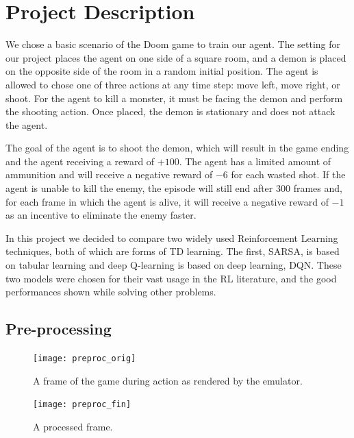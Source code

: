 \documentclass[letterpaper]{article} %
\begin{document}
\section{Project Description}
We chose a basic scenario of the Doom game to train our agent. The setting for our project places the agent on one side of a square room, and a demon is placed on the opposite side of the room in a random initial position. The agent is allowed to chose one of three actions at any time step: move left, move right, or shoot. For the agent to kill a monster, it must be facing the demon and perform the shooting action. Once placed, the demon is stationary  and does not attack the agent. 

The goal of the agent is to shoot the demon, which will result in the game ending and the agent receiving a reward of $+100$. The agent has a limited amount of ammunition and will receive a negative reward of $-6$ for each wasted shot. If the agent is unable to kill the enemy, the episode will still end after $300$ frames and, for each frame in which the agent is alive, it will receive a negative reward of $-1$ as an incentive to eliminate the enemy faster.

In this project we decided to compare two widely used Reinforcement Learning techniques, both of which are forms of TD learning. The first, SARSA, is based on tabular learning and deep Q-learning is based on deep learning, DQN. These two models were chosen for their vast usage in the RL literature, and the good performances shown while solving other problems.


\subsection{Pre-processing}

\begin{figure}
  \texttt{[image: preproc\_orig]}
  \caption{A frame of the game during action as rendered by the emulator.}
\label{preproc_orig}
\end{figure}

\begin{figure}
  \texttt{[image: preproc\_fin]}
  \caption{A processed frame.}
\label{preproc_fin}
\end{figure}
\end{document}
